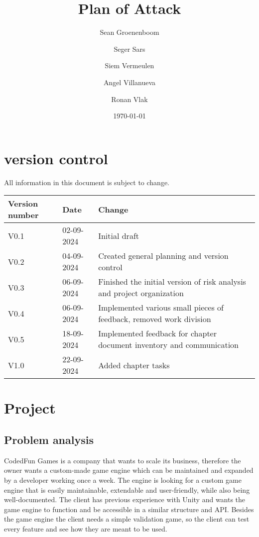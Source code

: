 \documentclass{article} %
\title{Plan of Attack} %
\author{Sean Groenenboom \and Seger Sars \and Siem Vermeulen \and Angel Villanueva \and Ronan Vlak} %
\date{\today} %
\begin{document}
\maketitle %
\newpage

\tableofcontents %
\newpage

\section{version control}
All information in this document is subject to change. \\
\begin{tabularx}{\textwidth}{|X|X|X|}
    \hline
    \textbf{Version number} & \textbf{Date} & \textbf{Change}                                                        \\ \hline
    V0.1                    & 02-09-2024    & Initial draft                                                          \\ \hline
    V0.2                    & 04-09-2024    & Created general planning and version control                           \\ \hline
    V0.3                    & 06-09-2024    & Finished the initial version of risk analysis and project organization \\ \hline
    V0.4                    & 06-09-2024    & Implemented various small pieces of feedback, removed work division    \\ \hline
    V0.5                    & 18-09-2024    & Implemented feedback for chapter document inventory and communication  \\ \hline
V1.0 & 22-09-2024 & Added chapter tasks \\ \hline
\end{tabularx}
\newpage

\section{Project}
\subsection{Problem analysis}
CodedFun Games is a company that wants to scale its business, therefore
the owner wants a custom-made game engine which can be maintained and expanded by a developer working once a week.
The engine is looking for a custom game engine that is easily maintainable, extendable and user-friendly, while also being well-documented.
The client has previous experience with Unity and wants the game engine to function and be accessible in a similar structure and API.
\newline \newline
Besides the game engine the client needs a simple validation game, so the client can test every feature and see how they are meant to be used.
\end{document}
